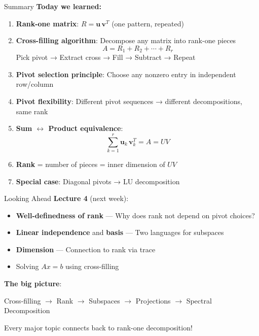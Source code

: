 \documentclass[10pt]{beamer}
\theoremstyle{definition}
\newcommand{\x}[1]{\alert{\textbf{#1}}}
\begin{document}
\begin{frame}{Summary}
\textbf{Today we learned:}

\begin{enumerate}
\item \textbf{Rank-one matrix}: $R = \mathbf{u}\,\mathbf{v}^T$ (one pattern, repeated)

\item \textbf{Cross-filling algorithm}: Decompose any matrix into rank-one pieces
$$A = R_1 + R_2 + \cdots + R_r$$
Pick pivot → Extract cross → Fill → Subtract → Repeat

\item \textbf{Pivot selection principle}: Choose any nonzero entry in independent row/column

\item \textbf{Pivot flexibility}: Different pivot sequences → different decompositions, same rank

\item \textbf{Sum $\leftrightarrow$ Product equivalence}:
$$\sum_{k=1}^r \mathbf{u}_k\,\mathbf{v}_k^T = A = UV$$

\item \textbf{Rank} = number of pieces = inner dimension of $UV$

\item \textbf{Special case}: Diagonal pivots → LU decomposition
\end{enumerate}
\end{frame}

\begin{frame}{Looking Ahead}
\textbf{Lecture 4} (next week):
\begin{itemize}
\item \x{Well-definedness of rank} — Why does rank not depend on pivot choices?
\item \x{Linear independence} and \x{basis} — Two languages for subspaces
\item \x{Dimension} — Connection to rank via trace
\item Solving $Ax = b$ using cross-filling
\end{itemize}

\vfill
\textbf{The big picture}:
\begin{center}
Cross-filling $\to$ Rank $\to$ Subspaces $\to$ Projections $\to$ Spectral Decomposition
\end{center}

Every major topic connects back to rank-one decomposition!
\end{frame}
\end{document}

